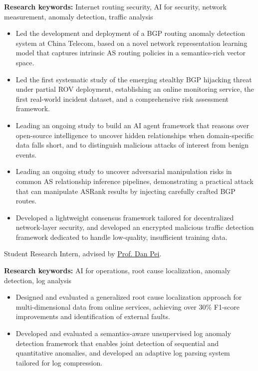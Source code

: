 \documentclass[10pt,a4paper,roman]{moderncv}
\begin{document}
\textbf{Research keywords:} Internet routing security, AI for security, network measurement, anomaly detection, traffic analysis
\begin{itemize}
    \item Led the development and deployment of a BGP routing anomaly detection system at China Telecom, based on a novel network representation learning model that captures intrinsic AS routing policies in a semantics-rich vector space.
    \item Led the first systematic study of the emerging stealthy BGP hijacking threat under partial ROV deployment, establishing an online monitoring service, the first real-world incident dataset, and a comprehensive risk assessment framework.
    \item Leading an ongoing study to build an AI agent framework that reasons over open-source intelligence to uncover hidden relationships when domain-specific data falls short, and to distinguish malicious attacks of interest from benign events.
    \item Leading an ongoing study to uncover adversarial manipulation risks in common AS relationship inference pipelines, demonstrating a practical attack that can manipulate ASRank results by injecting carefully crafted BGP routes.
    \item Developed a lightweight consensus framework tailored for decentralized network-layer security, and developed an encrypted malicious traffic detection framework dedicated to handle low-quality, insufficient training data.
\end{itemize}
\addvspace{.8em}

Student Research Intern, advised by \href{https://netman.aiops.org/~peidan/}{Prof. Dan Pei}.

\textbf{Research keywords:} AI for operations, root cause localization, anomaly detection, log analysis
\begin{itemize}
    \item Designed and evaluated a generalized root cause localization approach for multi-dimensional data from online services, achieving over 30\% F1-score improvements and identification of external faults.
    \item Developed and evaluated a semantics-aware unsupervised log anomaly detection framework that enables joint detection of sequential and quantitative anomalies, and developed an adaptive log parsing system tailored for log compression.
\end{itemize}
\end{document}
